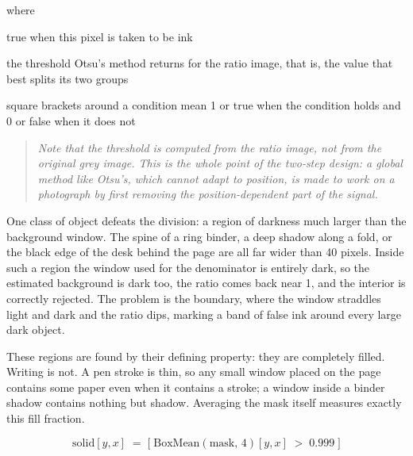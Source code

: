 \noindent where
\begin{description}[leftmargin=2.4em,style=nextline,font=\normalfont\ttfamily]\setlength\itemsep{1pt}
  \item[{$\mathrm{mask}[y,x]$}] \normalfont true when this pixel is taken to be ink
  \item[{$t_{\mathrm{Otsu}}(\mathrm{ratio})$}] \normalfont the threshold Otsu's method returns for the ratio image, that is, the value that best splits its two groups
  \item[{$[\;\cdot\;]$}] \normalfont square brackets around a condition mean 1 or true when the condition holds and 0 or false when it does not
\end{description}

\begin{quote}\small\itshape Note that the threshold is computed from the ratio image, not from the original grey image. This is the whole point of the two-step design: a global method like Otsu's, which cannot adapt to position, is made to work on a photograph by first removing the position-dependent part of the signal.\end{quote}

One class of object defeats the division: a region of darkness much larger than the background window. The spine of a ring binder, a deep shadow along a fold, or the black edge of the desk behind the page are all far wider than 40 pixels. Inside such a region the window used for the denominator is entirely dark, so the estimated background is dark too, the ratio comes back near 1, and the interior is correctly rejected. The problem is the boundary, where the window straddles light and dark and the ratio dips, marking a band of false ink around every large dark object.

These regions are found by their defining property: they are completely filled. Writing is not. A pen stroke is thin, so any small window placed on the page contains some paper even when it contains a stroke; a window inside a binder shadow contains nothing but shadow. Averaging the mask itself measures exactly this fill fraction.


\begin{equation}
\mathrm{solid}[y,x] \;=\; \big[\;\mathrm{BoxMean}(\mathrm{mask},\,4)[y,x] \;>\; 0.999\;\big]
\end{equation}

